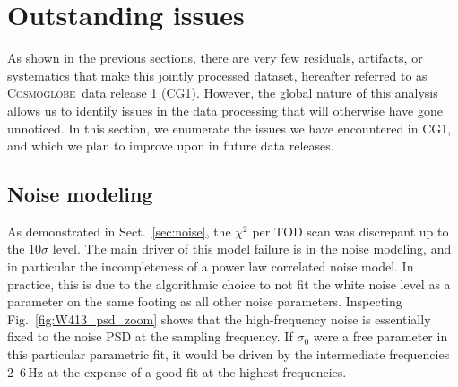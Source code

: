 \documentclass[twocolumn]{../../common/aa}
\newcommand{\cosmoglobe}{\textsc{Cosmoglobe}}
\begin{document}






















\section{Outstanding issues}
\label{sec:issues}

As shown in the previous sections, there are very few residuals, artifacts, or systematics that make this jointly processed dataset, hereafter referred to as \cosmoglobe\ data release 1 (CG1). However, the global nature of this analysis allows us to identify issues in the data processing that will otherwise have gone unnoticed. In this section, we enumerate the issues we have encountered in CG1, and which we plan to improve upon in future data releases.

\subsection{Noise modeling}
\label{sec:noisemodel}

As demonstrated in Sect.~\ref{sec:noise}, the $\chi^2$ per TOD scan was discrepant up to the $10\sigma$ level. The main driver of this model failure is in the noise modeling, and in particular the incompleteness of a power law correlated noise model. In practice, this is due to the algorithmic choice to not fit the white noise level as a parameter on the same footing as all other noise parameters. Inspecting Fig.~\ref{fig:W413_psd_zoom} shows that the high-frequency noise is essentially fixed to the noise PSD at the sampling frequency. If $\sigma_0$ were a free parameter in this particular parametric fit, it would be driven by the intermediate frequencies 2--6\,Hz at the expense of a good fit at the highest frequencies.
\end{document}
